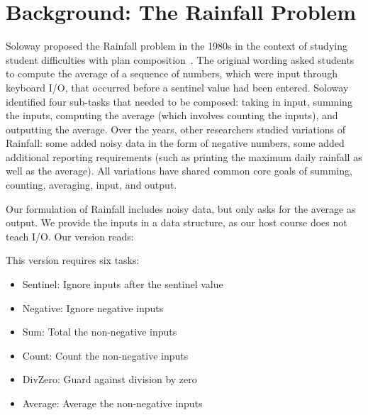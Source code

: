 \section{Background: The Rainfall Problem}
\label{s:rainfall}

Soloway proposed the Rainfall problem in the 1980s in the context of
studying student difficulties with plan
composition~\cite{soloway-learning86}.  The original wording asked
students to compute the average of a sequence of numbers, which were
input through keyboard I/O, that occurred before a sentinel value had
been entered.  Soloway identified four sub-tasks that needed to be
composed: taking in input, summing the inputs, computing the average
(which involves counting the inputs), and outputting the average.  Over
the years, other researchers studied variations of Rainfall: some
added noisy data in the form of negative numbers, some added
additional reporting requirements (such as printing the maximum daily
rainfall as well as the average).  All variations have shared
common core goals of summing, counting, averaging, input, and output.

Our formulation of Rainfall includes noisy data, but only asks for the
average as output.  We provide the inputs in a data structure, as our
host course does not teach I/O.  Our version reads:

\begin{center}
\end{center}

This version requires six tasks:

\begin{itemize}%
\item Sentinel: Ignore inputs after the sentinel value
\item Negative: Ignore negative inputs
\item Sum: Total the non-negative inputs
\item Count: Count the non-negative inputs
\item DivZero: Guard against division by zero
\item Average: Average the non-negative inputs
\end{itemize}


